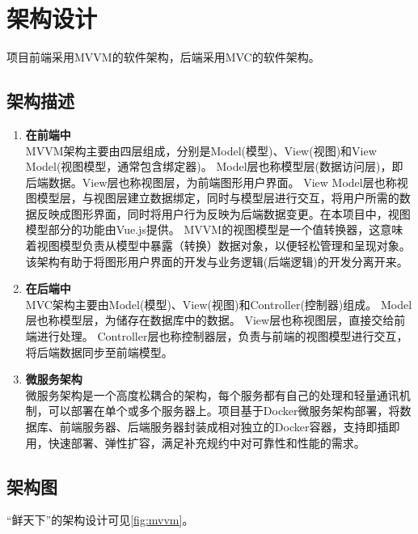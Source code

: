 \chapter{架构设计}

项目前端采用MVVM的软件架构，后端采用MVC的软件架构。

\section{架构描述}

\begin{enumerate}
    \item \textbf{在前端中} \\
    MVVM架构主要由四层组成，分别是Model(模型)、View(视图)和View Model(视图模型，通常包含绑定器)。
    Model层也称模型层(数据访问层)，即后端数据。View层也称视图层，为前端图形用户界面。
    View Model层也称视图模型层，与视图层建立数据绑定，同时与模型层进行交互，将用户所需的数据反映成图形界面，同时将用户行为反映为后端数据变更。在本项目中，视图模型部分的功能由Vue.js提供。
    MVVM的视图模型是一个值转换器，这意味着视图模型负责从模型中暴露（转换）数据对象，以便轻松管理和呈现对象。\\
    该架构有助于将图形用户界面的开发与业务逻辑(后端逻辑)的开发分离开来。
    \item \textbf{在后端中} \\
    MVC架构主要由Model(模型)、View(视图)和Controller(控制器)组成。
    Model层也称模型层，为储存在数据库中的数据。
    View层也称视图层，直接交给前端进行处理。
    Controller层也称控制器层，负责与前端的视图模型进行交互，将后端数据同步至前端模型。
    \item \textbf{微服务架构} \\
    微服务架构是一个高度松耦合的架构，每个服务都有自己的处理和轻量通讯机制，可以部署在单个或多个服务器上。项目基于Docker微服务架构部署，将数据库、前端服务器、后端服务器封装成相对独立的Docker容器，支持即插即用，快速部署、弹性扩容，满足补充规约中对可靠性和性能的需求。
\end{enumerate}


\section{架构图}

“鲜天下”的架构设计可见\autoref{fig:mvvm}。

